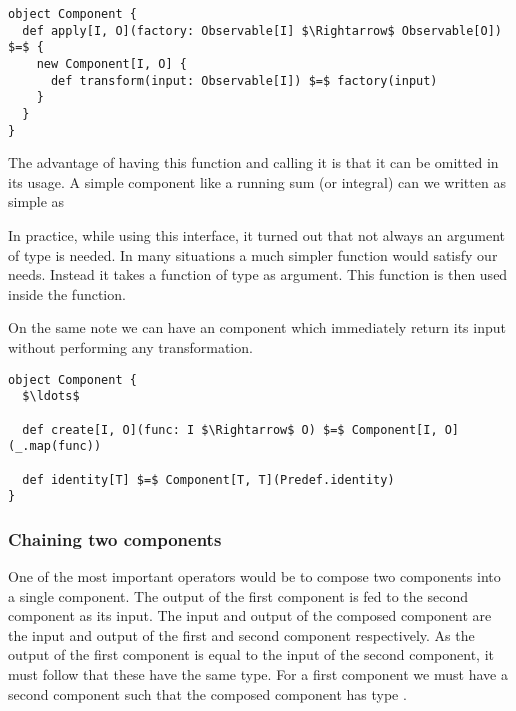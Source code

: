 \begin{lstlisting}[style=InlineScalaStyle]
object Component {
  def apply[I, O](factory: Observable[I] $\Rightarrow$ Observable[O]) $=$ {
    new Component[I, O] {
      def transform(input: Observable[I]) $=$ factory(input)
    }
  }
}
\end{lstlisting}

The advantage of having this function and calling it  is that it can be omitted in its usage. A simple component like a running sum (or integral) can we written as simple as 

In practice, while using this interface, it turned out that not always an argument of type  is needed. In many situations a much simpler function would satisfy our needs. Instead it takes a function of type  as argument. This function is then used inside the  function.

On the same note we can have an  component which immediately return its input without performing any transformation.

\begin{lstlisting}[style=InlineScalaStyle]
object Component {
  $\ldots$

  def create[I, O](func: I $\Rightarrow$ O) $=$ Component[I, O](_.map(func))
  
  def identity[T] $=$ Component[T, T](Predef.identity)
}
\end{lstlisting}

\subsubsection{Chaining two components}
One of the most important operators would be to compose two components into a single component. The output of the first component is fed to the second component as its input. The input and output of the composed component are the input and output of the first and second component respectively. As the output of the first component is equal to the input of the second component, it must follow that these have the same type. For a first component  we must have a second component  such that the composed component  has type .


